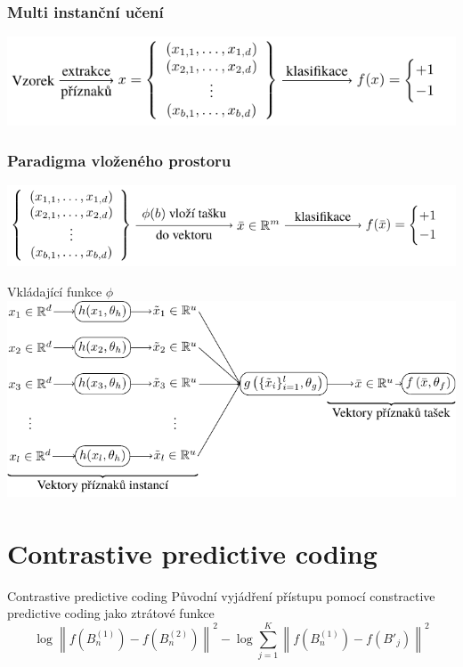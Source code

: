\documentclass[10pt]{beamer}
\begin{document}
\begin{frame}[c]\frametitle{Multi instanční učení}
	\centering
	\includegraphics{images/multi_instance_learning/multi_instance_learning.pdf}
\end{frame}

\begin{frame}[c]\frametitle{Paradigma vloženého prostoru}
	\centering
	\includegraphics{images/embedded_space_paradigm/embedded_space_paradigm.pdf}
\end{frame}

\begin{frame}{Vkládající funkce \( \phi \)}
	\centering
	\includegraphics[width=0.9\pagewidth]{images/embedding_function/embedding_function.pdf}
\end{frame}

\section{Contrastive predictive coding}

\begin{frame}{Contrastive predictive coding}
	Původní vyjádření přístupu pomocí constractive predictive coding jako ztrátové funkce
	\[ \log \left\lVert f \left( B_n^{(1)} \right) - f \left( B_n^{(2)} \right) \right\rVert^2 - \log \sum_{j = 1}^K \left\lVert f \left( B_n^{(1)} \right) - f \left( B'_j \right) \right\rVert^2 \]
\end{frame}
\end{document}
